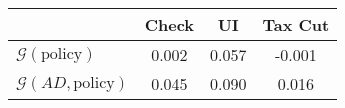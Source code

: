\begin{tabular}{@{}lccc@{}} 
\toprule 
                          & Check      & UI    & Tax Cut    \\  \midrule 
$\mathcal{G}(\text{policy})$ & 0.002  & 0.057  & -0.001     \\ 
$\mathcal{G}(AD,\text{policy})$ & 0.045  & 0.090  & 0.016     \\ 
\end{tabular}  
